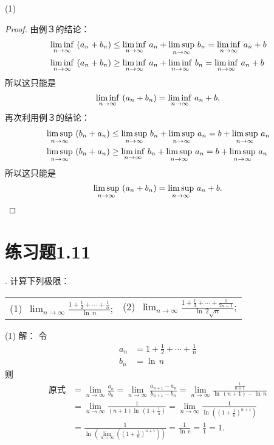 \noindent (1)
\begin{proof}
由例３的结论：
\begin{align}
    &\mathop{\underset{n \to \infty}{\lim \inf}} \, \left( a_n + b_n \right) \leq \mathop{\underset{n \to \infty}{\lim \inf}} \, a_n + \mathop{\underset{n \to \infty}{\lim \sup}} \, b_n = \mathop{\underset{n \to \infty}{\lim \inf}} \, a_n + b \\
    &\mathop{\underset{n \to \infty}{\lim \inf}} \, \left( a_n + b_n \right) \geq \mathop{\underset{n \to \infty}{\lim \inf}} \, a_n + \mathop{\underset{n \to \infty}{\lim \inf}} \, b_n = \mathop{\underset{n \to \infty}{\lim \inf}} \, a_n + b 
\end{align}
所以这只能是
\begin{equation}
    \mathop{\underset{n \to \infty}{\lim \inf}} \, \left( a_n + b_n \right) = \mathop{\underset{n \to \infty}{\lim \inf}} \, a_n + b.
\end{equation}
再次利用例３的结论：
\begin{align}
    &\mathop{\underset{n \to \infty}{\lim \sup}} \, \left( b_n + a_n \right) \leq \mathop{\underset{n \to \infty}{\lim \sup}} \, b_n + \mathop{\underset{n \to \infty}{\lim \sup}} \, a_n = b + \mathop{\underset{n \to \infty}{\lim \sup}} \, a_n \\
    &\mathop{\underset{n \to \infty}{\lim \sup}} \, \left( b_n + a_n \right) \geq \mathop{\underset{n \to \infty}{\lim \inf}} \, b_n + \mathop{\underset{n \to \infty}{\lim \sup}} \, a_n = b + \mathop{\underset{n \to \infty}{\lim \sup}} \, a_n
\end{align}
所以这只能是
\begin{equation}
    \mathop{\underset{n \to \infty}{\lim \sup}} \, \left( a_n + b_n \right) = \mathop{\underset{n \to \infty}{\lim \sup}} \, a_n + b.
\end{equation}
\end{proof}

\section*{练习题1.11}
. 计算下列极限：
\begin{table}[H]
    \centering
    \begin{tabularx}{\textwidth} {  >{\raggedright\arraybackslash}X >{\raggedright\arraybackslash}X  }
       (1)~$\displaystyle\lim_{n\to\infty}\displaystyle\frac{1+\displaystyle\frac{1}{2}+\cdots+\displaystyle\frac{1}{n}}{\ln \, n}$; & (2)~$\displaystyle\lim_{n\to\infty}\displaystyle\frac{1+\displaystyle\frac{1}{3}+\cdots+\displaystyle\frac{1}{2n-1}}{\ln \, 2\sqrt{n}}$; 
    \end{tabularx}
\end{table}

\noindent (1) 解：
令
\begin{align}
    a_n &= 1+\frac{1}{2}+\cdots+\frac{1}{n} \\
    b_n &= \ln \, n
\end{align}
则
\begin{align}
    \text{原式} &= \lim_{n\to\infty} \frac{a_n}{b_n} = \lim_{n \to \infty} \frac{a_{n+1}-a_n}{b_{n+1}-b_n} = \lim_{n \to \infty} \frac{\displaystyle\frac{1}{n+1}}{\ln \, \left( n+1 \right) - \ln \, n} \\
    &= \lim_{n \to \infty} \frac{1}{(n+1) \ln \, \left( 1 + \displaystyle\frac{1}{n}\right)} = \lim_{n \to \infty} \frac{1}{\ln \, \left( \left(1+\displaystyle\frac{1}{n}\right)^{n+1}\right)} \\
    &= \frac{1}{\ln \, \left( \displaystyle\lim_{n \to \infty} \left( \left(1 + \displaystyle\frac{1}{n}\right)^{n+1}\right)\right)} = \frac{1}{\ln \, \mathrm{e}} = \frac{1}{1} = 1.
\end{align}

